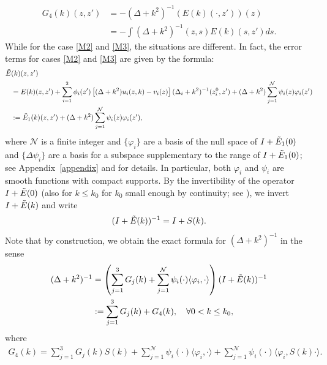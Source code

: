 \documentclass[12pt]{amsart}
\begin{document}
\begin{align}
    G_4(k)(z,z') &= - (\Delta+k^2)^{-1} \left(E(k)(\cdot, z')\right)(z)\\ \nonumber
    &= - \int (\Delta + k^2)^{-1}(z,s) E(k)(s,z') ds.
\end{align}
While for the case \eqref{M2} and \eqref{M3}, the situations are different. In fact, the error terms for cases \eqref{M2} and \eqref{M3} are given by the formula:
\begin{align}\label{eq_error4}
    \Tilde{E}&(k)(z,z')\\ \nonumber
    &= E(k)(z,z') + \sum_{i=1}^2 \phi_i(z') \left[ (\Delta+k^2)u_i(z,k) - v_i(z) \right] (\Delta_i+k^2)^{-1}(z_i^0,z') + (\Delta+k^2)\sum_{j=1}^{\mathcal{N}} \psi_i(z)  \varphi_i(z')\\ \nonumber
    &:= \Tilde{E}_1(k)(z,z') + (\Delta+k^2)\sum_{j=1}^{\mathcal{N}} \psi_i(z)  \varphi_i(z'),
\end{align}
where $\mathcal{N}$ is a finite integer and $\{\varphi_i\}$ are a basis of the null space of $I+\Tilde{E}_1(0)$ and $\{\Delta \psi_i\}$ are a basis for a subspace supplementary to the range of $I+\Tilde{E}_1(0)$; see Appendix~\ref{appendix} and \cite[Lemma~3.3, 3.4]{HNS} for details. In particular, both $\varphi_i$ and $\psi_i$ are smooth functions with compact supports. By the invertibility of the operator $I+\Tilde{E}(0)$ \cite[Lemma~3.5]{HNS} (also for $k\le k_0$ for $k_0$ small enough by continuity; see \cite[Lemma~3.1]{HNS}), we invert $I+\Tilde{E}(k)$ and write 
\begin{align*}
    (I+\Tilde{E}(k))^{-1} = I + S(k).
\end{align*}
Note that by construction, we obtain the exact formula for $(\Delta+k^2)^{-1}$ in the sense
\begin{align}\label{parametrix_R2}
    (\Delta+k^2)^{-1} &= \left(\sum_{j=1}^3 G_j(k) + \sum_{j=1}^{\mathcal{N}} \psi_i(\cdot) \langle \varphi_i, \cdot\rangle \right) (I+\Tilde{E}(k))^{-1}\\
    &:= \sum_{j=1}^3 G_j(k) + G_4(k),\quad \forall 0<k\le k_0,
\end{align}
where
\begin{align*}
    G_4(k) = \sum_{j=1}^3 G_j(k)S(k) + \sum_{j=1}^{\mathcal{N}} \psi_i(\cdot) \langle \varphi_i, \cdot\rangle + \sum_{j=1}^{\mathcal{N}} \psi_i(\cdot) \langle \varphi_i, S(k) \cdot \rangle.
\end{align*}
\end{document}
